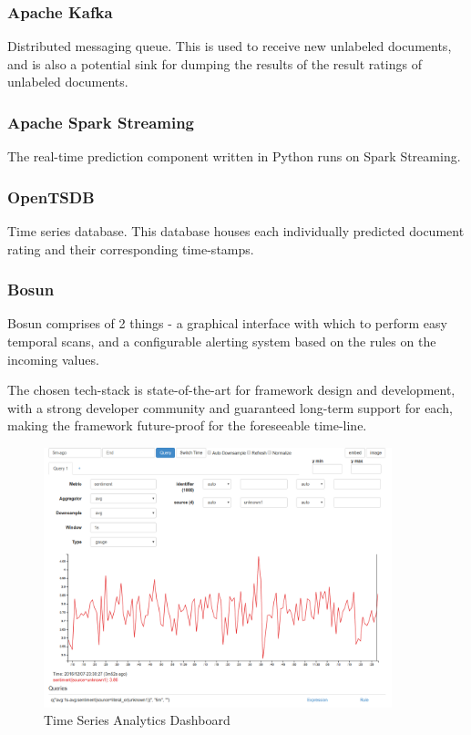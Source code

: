 \documentclass[conference]{IEEEtran}
\begin{document}
        \subsubsection{Apache Kafka} \label{kafka}
            Distributed messaging queue. This is used to receive new unlabeled documents, and is also a potential sink for dumping the results of the result ratings of unlabeled documents\cite{kreps2011kafka}.
        
        \subsubsection{Apache Spark Streaming} \label{spark}
            The real-time prediction component written in Python runs on Spark Streaming\cite{zaharia2012discretized}.
        
        \subsubsection{OpenTSDB} \label{opentsdb}
            Time series database. This database houses each individually predicted document rating and their corresponding time-stamps\cite{opentsdb}.
        
        \subsubsection{Bosun}
            Bosun comprises of 2 things - a graphical interface with which to perform easy temporal scans, and a configurable alerting system based on the rules on the incoming values\cite{bosun_repo}. 

        The chosen tech-stack is state-of-the-art for framework design and development, with a strong developer community and guaranteed long-term support for each, making the framework future-proof for the foreseeable time-line.

\begin{figure}[ht] \label{fig:time-series-analytics-dashboard}
    \centering
    \includegraphics[width=0.9\textwidth]{images/bosun_dash_1.png}
    \caption{Time Series Analytics Dashboard}
\end{figure}
\end{document}

